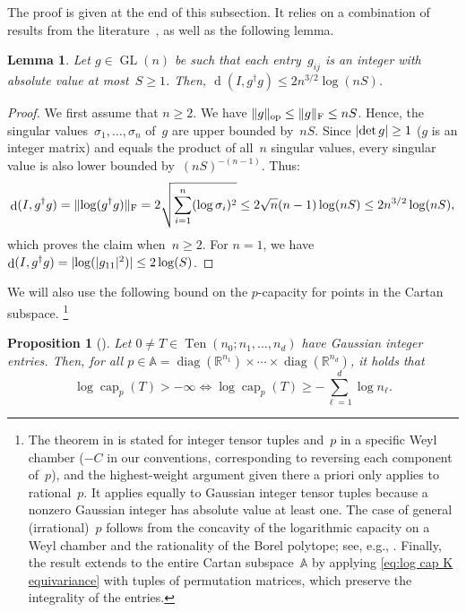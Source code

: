 \documentclass[11pt,letterpaper]{article}
\newtheorem{lemma}[theorem]{Lemma}\AddToHook{env/lemma/begin}{\crefalias{theorem}{lemma}}
\newtheorem{proposition}[theorem]{Proposition}\AddToHook{env/proposition/begin}{\crefalias{theorem}{proposition}}\crefname{proposition}{Proposition}{Propositions}
\numberwithin{equation}{section}
\renewcommand{\AA}{\mathbb{A}}
\newcommand{\RR}{\mathbb{R}}
\DeclareMathOperator{\capacity}{cap}
\DeclareMathOperator{\dist}{d}
\DeclareMathOperator{\GL}{GL}
\DeclareMathOperator{\diag}{diag}
\DeclareMathOperator{\ope}{op}
\DeclareMathOperator{\Ten}{Ten}
\DeclarePairedDelimiter\abs{\lvert}{\rvert}
\DeclarePairedDelimiter\norm{\lVert}{\rVert}
\begin{document}
The proof is given at the end of this subsection.
It relies on a combination of results from the literature~\cite{BFGOWW2018,BCLNWZ2025computingmomentpolytopes}, as well as the following lemma.

\begin{lemma}\label{lem:busemann_valuebound}
    Let $g \in \GL(n)$ be such that each entry~$g_{ij}$ is an integer with absolute value at most~$S\geq1$.
    Then,
    $\dist(I, g^\dagger g) \leq 2 n^{3/2}\log (nS)$.
\end{lemma}
\begin{proof}
    We first assume that $n\geq2$.
    We have $\norm g_{\ope} \leq \norm g_{\mathrm F} \leq nS$.
    Hence, the singular values~$\sigma_1,\dots,\sigma_n$ of~$g$ are upper bounded by~$nS$.
    Since $\abs{\det g}\geq1$ ($g$ is an integer matrix) and equals the product of all~$n$ singular values, every singular value is also lower bounded by~$(nS)^{-(n-1)}$.
    Thus:
    \begin{align*}
        \dist(I, g^\dagger g)
    = \norm{\log(g^\dagger g)}_{\mathrm F}
    = 2 \sqrt{\sum_{i=1}^n (\log \sigma_i)^2}
    \leq 2 \sqrt n (n-1) \log(nS)
    \leq 2 n^{3/2} \log(nS),
    \end{align*}
    which proves the claim when~$n\geq2$.
    For $n=1$, we have
    $\dist(I, g^\dagger g)
    = \abs{\log (\abs{g_{11}}^2)}
    \leq 2 \log(S)$.
\end{proof}

We will also use the following bound on the $p$-capacity for points in the Cartan subspace.%
\footnote{The theorem in \cite{BFGOWW2018} is stated for integer tensor tuples and~$p$ in a specific Weyl chamber ($-C$ in our conventions, corresponding to reversing each component of~$p$), and the highest-weight argument given there a priori only applies to rational~$p$.
It applies equally to Gaussian integer tensor tuples because a nonzero Gaussian integer has absolute value at least one.
The case of general (irrational)~$p$ follows from the concavity of the logarithmic capacity on a Weyl chamber and the rationality of the Borel polytope; see, e.g., \cite[App.~A.1]{BFGOWW2018}.
Finally, the result extends to the entire Cartan subspace~$\AA$ by applying \cref{eq:log cap K equivariance} with tuples of permutation matrices, which preserve the integrality of the entries.}

\begin{proposition}[{\cite[Thm.~2.13]{BFGOWW2018}}]\label{prop:tensor_capacitylowerbound}
    Let $0 \neq T \in \Ten(n_0; n_1, \ldots, n_d)$ have Gaussian integer entries.
    Then, for all $p \in \AA = \diag(\RR^{n_1})\times\cdots\times\diag(\RR^{n_d})$, it holds that
    \[
        \log\capacity_p(T) > -\infty \iff \log\capacity_p(T) \ge -\sum_{\ell = 1}^d\log n_\ell.
    \]
\end{proposition}
\end{document}
